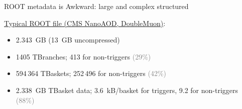 \documentclass[aspectratio=169]{beamer}
\begin{document}
\begin{frame}{ROOT metadata is Awkward: large and complex structured}
\vspace{0.5 cm}

\underline{Typical ROOT file (CMS NanoAOD, DoubleMuon)}:

\vspace{0.2 cm}
\begin{itemize}
\item 2.343~GB (13~GB uncompressed)
\item 1405 TBranches; 413 for non-triggers \textcolor{gray}{(29\%)}
\item 594\,364 TBaskets; 252\,496 for non-triggers \textcolor{gray}{(42\%)}
\item 2.338~GB TBasket data; 3.6~kB/basket for triggers, 9.2 for non-triggers \textcolor{gray}{(88\%)}
\end{itemize}

\vspace{0.35 cm}

\vspace{0.35 cm}

\vspace{0.35 cm}
\end{frame}
\end{document}

